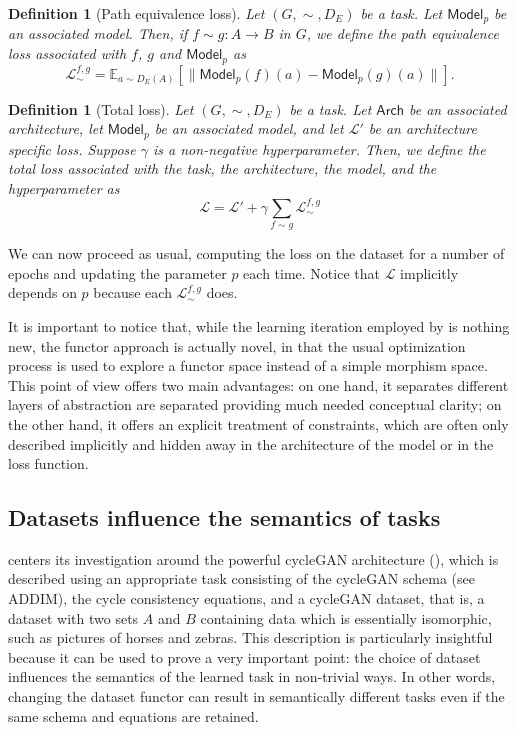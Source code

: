 \documentclass[11pt,a4paper,openright,twoside]{report}
\newcounter{mycounter}
\theoremstyle{plain}
\newtheorem{definition}[mycounter]{Definition}
\theoremstyle{definition}
\begin{document}
\begin{definition}[Path equivalence loss]
  Let $(G,{\sim},D_E)$ be a task. Let $\mathsf{Model}_p$ be an associated model. Then, if $f \sim g: A \to B$ in $G$, we define the path equivalence loss associated with $f$, $g$ and $\mathsf{Model}_p$ as 
  \[\mathcal{L}_{\sim}^{f,g} = \mathbb{E}_{a \sim D_E(A)}[\|\mathsf{Model}_p(f)(a) - \mathsf{Model}_p(g)(a)\|].\]  
\end{definition}

\begin{definition}[Total loss]
  Let $(G,{\sim},D_E)$ be a task. Let $\mathsf{Arch}$ be an associated architecture, let $\mathsf{Model}_p$ be an associated model, and let $\mathcal{L}'$ be an architecture specific loss. Suppose $\gamma$ is a non-negative hyperparameter. Then, we define the total loss associated with the task, the architecture, the model, and the hyperparameter as
  \begin{equation}
    \label{eq: sumoflosses}
    \mathcal{L} = \mathcal{L}' + \gamma\sum_{f \sim g}\mathcal{L}_{\sim}^{f,g}
  \end{equation}
\end{definition}

We can now proceed as usual, computing the loss on the dataset for a number of epochs and updating the parameter $p$ each time. Notice that $\mathcal{L}$ implicitly depends on $p$ because each $\mathcal{L}_{\sim}^{f,g}$ does.

It is important to notice that, while the learning iteration employed by \cite{gavranovic2019compositional} is nothing new, the functor approach is actually novel, in that the usual optimization process is used to explore a functor space instead of a simple morphism space. This point of view offers two main advantages: on one hand, it separates different layers of abstraction are separated providing much needed conceptual clarity; on the other hand, it offers an explicit treatment of constraints, which are often only described implicitly and hidden away in the architecture of the model or in the loss function. 

\subsection{Datasets influence the semantics of tasks}

\cite{gavranovic2019compositional} centers its investigation around the powerful cycleGAN architecture (\cite{zhu2017unpaired}), which is described using an appropriate task consisting of the cycleGAN schema (see ADDIM), the cycle consistency equations, and a cycleGAN dataset, that is, a dataset with two sets $A$ and $B$ containing data which is essentially isomorphic, such as pictures of horses and zebras. This description is particularly insightful because it can be used to prove a very important point: the choice of dataset influences the semantics of the learned task in non-trivial ways. In other words, changing the dataset functor can result in semantically different tasks even if the same schema and equations are retained. 
\end{document}
